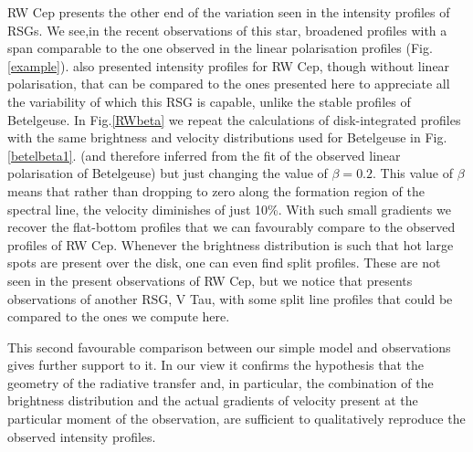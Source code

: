 \documentclass{/Users/art2/TeX/aanda/aa}
\begin{document}
RW Cep presents the other end of the variation seen in the intensity profiles of RSGs. We see,in the recent observations of this star, 
broadened profiles with a span comparable to the one observed in the linear polarisation profiles (Fig. \ref{example}). 
\cite{josselin_atmospheric_2007} also 
presented intensity profiles for RW Cep, though without linear polarisation, that can be compared to the ones presented here to appreciate 
all the variability of which this RSG is capable, unlike the stable profiles of Betelgeuse.
 In Fig.\ref{RWbeta} we repeat 
the  calculations of disk-integrated profiles with the same brightness and velocity distributions used for Betelgeuse in Fig. \ref{betelbeta1}.
(and therefore inferred 
from the fit of the observed linear polarisation of Betelgeuse) but just changing the value of $\beta=0.2$. This value of $\beta$ means 
that rather than dropping to zero along the formation region of the spectral line, the velocity diminishes of just 10\%. With such 
small gradients we recover the flat-bottom profiles that we can favourably compare to the observed profiles of RW Cep. Whenever 
the brightness distribution is such that hot large spots are present over the disk, one can even find split profiles. These are not 
seen in the present observations of RW Cep, but we notice that \cite{kravchenko_tomography_2018} presents observations of another RSG, V Tau, with 
some split line profiles that could be compared to the ones we compute here. 

This second favourable comparison between our simple model and observations gives further support to it. In our view it confirms 
the hypothesis that the geometry of the radiative transfer and, in particular, the combination of the brightness distribution and 
the actual gradients of velocity present at the particular moment of the observation, are sufficient to qualitatively reproduce 
the observed intensity profiles. 
\end{document}

